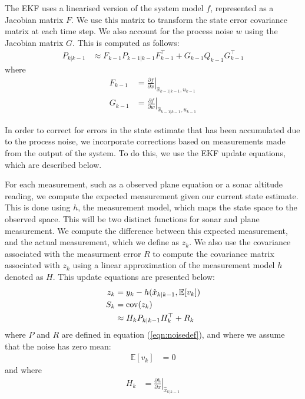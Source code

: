 \documentclass[]{article}
\begin{document}
{The EKF uses a linearised version of the system model $f$, represented as a Jacobian matrix $F$. We use this matrix to transform the state error covariance matrix at each time step. We also account for the process noise $w$ using the Jacobian matrix $G$. This is computed as follows:
\begin{align}
	P_{k|k-1} &\approx F_{k-1} P_{k-1|k-1} F_{k-1}^\top + G_{k-1} Q_{k-1} G_{k-1}^\top
	\label{eqn:predictP}
\end{align}
where
\begin{align}
	F_{k-1} &= \left . \frac{\partial f}{\partial x} \right \vert _{\hat{x}_{k-1|k-1},u_{k-1}} \\
	G_{k-1} &= \left . \frac{\partial f}{\partial w} \right \vert _{\hat{x}_{k-1|k-1},u_{k-1}}
\end{align}

In order to correct for errors in the state estimate that has been accumulated due to the process noise, we incorporate corrections based on measurements made from the output of the system. To do this, we use the EKF update equations, which are described below.

For each measurement, such as a observed plane equation or a sonar altitude reading, we compute the expected measurement given our current state estimate. This is done using $h$, the measurement model, which maps the state space to the observed space.
This will be two distinct functions for sonar and plane measurement.
We compute the difference between this expected measurement, and the actual measurement, which we define as $z_k$. We also use the covariance associated with the measurment error $R$ to compute the covariance matrix associated with $z_k$ using a linear approximation of the measurement model $h$ denoted as $H$. This update equations are presented below:
\begin{align}
	z_k &= y_k - h(\hat{x}_{k|k-1}, \mathbb{E}[v_k]) \\
	S_k &= \operatorname{cov}(z_k) \notag \\
		&\approx H_k P_{k|k-1} H_k^\top + R_k
\end{align}
where $P$ and $R$ are defined in equation (\ref{eqn:noisedef}), and where we assume that the noise has zero mean:
\begin{align}
	\mathbb{E}[v_k] &= 0
\end{align}
and where
\begin{align}
	H_{k} &= \left . \frac{\partial h}{\partial x} \right \vert _{\hat{x}_{k|k-1}}
\end{align}

}
\end{document}
